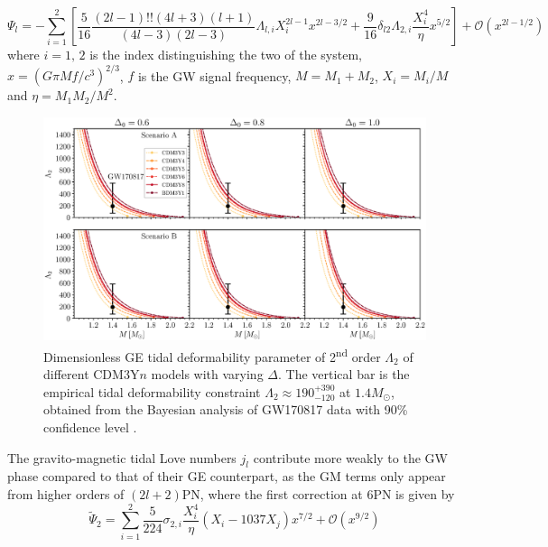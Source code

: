 \begin{equation}
    \Psi_l = - \sum^{2}_{i=1} \left[ \frac{5}{16} \frac{(2l-1)!! (4l+3)(l+1)}{(4l-3)(2l-3)} \Lambda_{l,i} X_i^{2l-1} x^{2l - 3/2} + \frac{9}{16} \delta_{l2} \Lambda_{2, i} \frac{X_i^4}{\eta} x^{5/2} \right] + \mathcal{O}(x^{2l-1/2})
\end{equation}
where $i=1,\,2$ is the index distinguishing the two  of the system, $x=\left( G\pi Mf/c^3 \right)^{2/3}$, $f$ is the \gls{GW} signal frequency, $M=M_1 + M_2$, $X_i = M_i/M$ and $\eta = M_1 M_2/M^2$.\par
\begin{figure}[ht!]
    \centering
    \includegraphics[width=\textwidth]{fig/Lambda2.eps}
    \caption{Dimensionless \gls{GE} tidal deformability parameter of 2\textsuperscript{nd} order $\Lambda_2$ of different CDM3Y$n$ models with varying $\Delta$. The vertical bar is the empirical tidal deformability constraint $\Lambda_2 \approx 190_{-120}^{+390}$ at $1.4M_\odot$, obtained from the Bayesian analysis of GW170817 data with 90\% confidence level \citep{abbott2018gw170817}.}
    \label{fig:Lambda2}
\end{figure} 
The gravito-magnetic tidal Love numbers $j_l$ contribute more weakly to the \gls{GW} phase compared to that of their \gls{GE} counterpart, as the \gls{GM} terms only appear from higher orders of $(2l+2)$PN, where the first correction at 6PN is given by \citep{perot2021role,yagi2017erratum}
\begin{equation}
    \tilde{\Psi}_2 = \sum^{2}_{i=1} \frac{5}{224} \sigma_{2,i} \frac{X_i^4}{\eta} \left( X_i - 1037X_j \right)x^{7/2} + \mathcal{O}(x^{9/2})
\end{equation}
